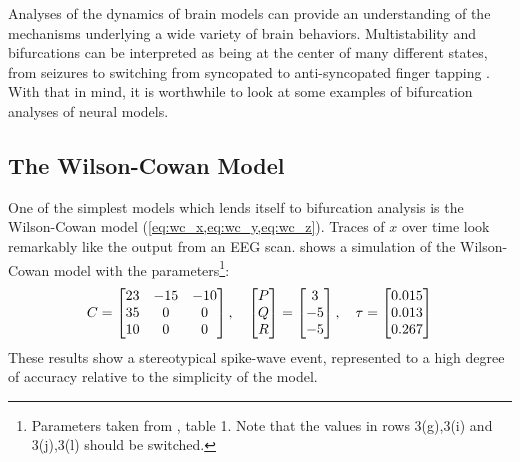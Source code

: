 Analyses of the dynamics of brain models can provide an understanding of the mechanisms underlying a wide variety of brain behaviors.
Multistability and bifurcations can be interpreted as being at the center of many different states, from seizures to switching from syncopated to anti-syncopated finger tapping \cite{Wang2012,Jirsa2014,Santos2017,Baier2012,Breakspear2005,Jirsa2014,Breakspear2017}.
With that in mind, it is worthwhile to look at some examples of bifurcation analyses of neural models.
\subsection{The Wilson-Cowan Model}
\label{sec:lit_review_bifurcation_wc}
One of the simplest models which lends itself to bifurcation analysis is the Wilson-Cowan model (\cref{eq:wc_x,eq:wc_y,eq:wc_z}).
Traces of $x$ over time look remarkably like the output from an EEG scan.
 shows a simulation of the Wilson-Cowan model with the parameters\footnote{Parameters taken from \cite{Wang2012}, table 1.  Note that the values in rows 3(g),3(i) and 3(j),3(l) should be switched.}:
\begin{equation}
  \label{eq:wc_params}
  C
  =
  \bmqty{23 & -15 & -10 \\ 35 & 0 & 0 \\ 10 & 0 & 0}
  \qc
  \bmqty{P \\ Q \\ R}
  =
  \bmqty{3 \\ -5 \\ -5}
  \qc
  \tau
  =
  \bmqty{0.015 \\ 0.013 \\ 0.267}
\end{equation}
These results show a stereotypical spike-wave event, represented to a high degree of accuracy relative to the simplicity of the model.
